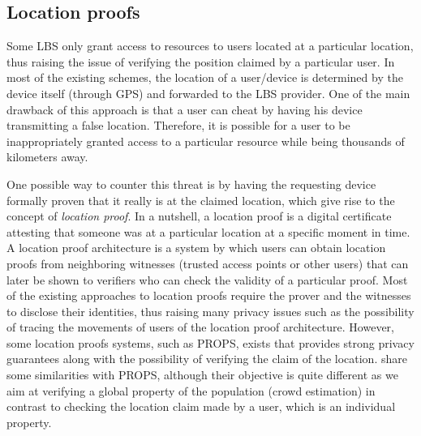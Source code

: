 \subsection{Location proofs}

Some LBS only grant access to resources to users located at a particular location, thus raising the issue of verifying the position claimed by a particular user. 
In most of the existing schemes, the location of a user/device is determined by the device itself (\eg through GPS) and forwarded to the LBS provider. 
One of the main drawback of this approach is that a user can cheat by having his device transmitting a false location. 
Therefore, it is possible for a user to be inappropriately granted access to a particular resource while being thousands of kilometers away.

One possible way to counter this threat is by having the requesting device formally proven that it really is at the claimed location, which give rise to the concept of \emph{location proof}. 
In a nutshell, a location proof is a digital certificate attesting that someone was at a particular location at a specific moment in time. A location proof architecture is a system by which users can obtain location proofs from neighboring witnesses (\eg trusted access points or other users) that can later be shown to verifiers who can check the validity of a particular proof. 
Most of the existing approaches to location proofs require the prover and the witnesses to disclose their identities, thus 
raising many privacy issues such as the possibility of tracing the movements of users of the location proof architecture.
However, some location proofs systems, such as PROPS, exists that provides strong privacy guarantees along with the possibility of verifying the claim of the location. 
\PRIVO share some similarities with PROPS, although their objective is quite different as we aim at verifying a global property of the population (\ie crowd estimation) in contrast to checking the location claim made by a user, which is an individual property.